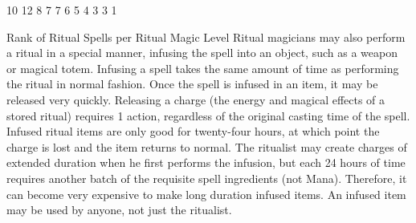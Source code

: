 \documentclass[twoside]{book}
\begin{document}
                  
                   10 
                   12 
                   8 
                   7 
                   7 
                   6 
                   5 
                   4 
                   3 
                   3 
                   1   
                  
                
                Rank of Ritual Spells per Ritual Magic Level
              Ritual magicians may also perform a ritual in a
               special manner, infusing the spell into an object, such as
               a weapon or magical totem. Infusing a spell takes the same
               amount of time as performing the ritual in normal fashion.
               Once the spell is infused in an item, it may be released
               very quickly. Releasing a charge (the energy and magical
               effects of a stored ritual) requires 1 action, regardless
               of the original casting time of the spell. Infused ritual
               items are only good for twenty-four hours, at which point
               the charge is lost and the item returns to normal. The
               ritualist may create charges of extended duration when he
               first performs the infusion, but each 24 hours of time
               requires another batch of the requisite spell ingredients
               (not Mana). Therefore, it can become very expensive to
               make long duration infused items. An infused item may be
               used by anyone, not just the ritualist. 
\end{document}
